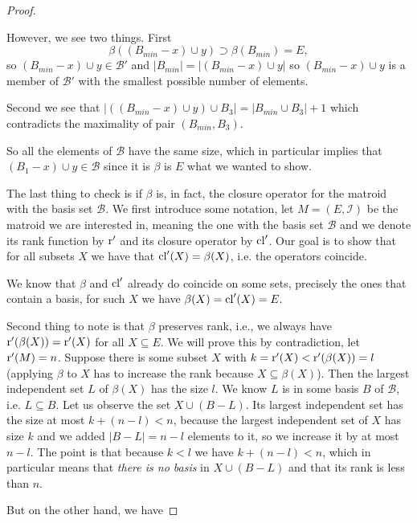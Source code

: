 \begin{proof}
\begin{enumerate}
\begin{enumerate}
    However, we see two things. First
    $$\beta((B_{min} - x) \cup y) \supset \beta(B_{min}) = E,$$ so $(B_{min} - x) \cup y \in \mathcal{B}'$ and $|B_{min}|  = |(B_{min} - x)\cup y|$ so $(B_{min} - x)\cup y$ is a member of $\mathcal{B}'$ with the smallest possible number of elements. 
    
    Second we see that $|((B_{min}-x)\cup y) \cup B_3| = |B_{min}\cup B_3|+1$ which contradicts the maximality of pair $(B_{min} ,B_3)$. 
    
    So all the elements of $\mathcal{B}$ have the same size, which in  particular implies that $(B_1 - x) \cup y \in \mathcal{B}$ since it is $\beta$  is $E$ what we wanted to show.
    

\end{enumerate}


\end{enumerate}

The last thing to check is if $\beta$ is, in fact, the closure operator for the matroid with the basis set $\mathcal{B}.$ We first introduce some notation, let $M = (E, \mathcal{I})$ be the matroid we are interested in, meaning the one with the basis set $\mathcal{B}$ and we denote its rank function by $\operatorname{r}'$ and its closure operator by $\mathrm{cl}'$. Our goal is to show that for all subsets $X$ we have that $\mathrm{cl}'(X) = \beta(X)$, i.e. the operators coincide.

We know that $\beta$ and $\mathrm{cl}'$ already do coincide on some sets, precisely the ones that contain a basis, for such $X$ we have $\beta(X) = \mathrm{cl}'(X) = E.$

Second thing to note is that $\beta$ preserves rank, i.e., we always have $\operatorname{r}'(\beta(X)) = \operatorname{r}'(X)$ for all $X\subseteq E$. We will prove this by contradiction, let $\operatorname{r}'(M) = n$. Suppose there is some subset $X$ with $k  = \operatorname{r}'(X)<\operatorname{r}'(\beta(X)) = l$ (applying $\beta$ to $X$ has to increase the rank because $X \subseteq \beta(X)$). Then the largest independent set $L$ of $\beta(X)$ has the size $l$. We know $L$ is in some basis $B$ of $\mathcal{B}$, i.e. $L \subseteq B$. Let us observe the set $X \cup (B-L)$.  Its largest independent set has the size at most $k + (n-l)<n$, because the largest independent set of $X$ has size $k$ and we added $|B-L| = n - l$ elements to it, so we increase it by at most $n-l$. The point is that because $k<l$ we have $k + (n-l)<n$, which in particular means that \textit{there is no basis} in $X \cup (B-L)$ and that its rank is less than $n.$


But on the other hand, we have


\end{proof}
